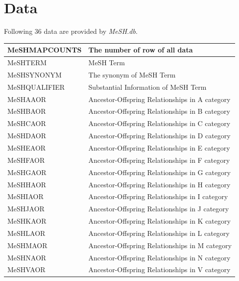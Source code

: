 \documentclass[11pt]{article}
\newcommand{\Rpackage}[1]{{\textit{#1}}}
\begin{document}
\section{Data}
Following 36 data are provided by \Rpackage{MeSH.db}.
\\
\begin{center}
  \begin{table}[htbp]
    \begin{tabular*}{150mm}{@{\extracolsep{\fill}}|p{40mm}|p{100mm}|}\hline
      MeSHMAPCOUNTS & The number of row of all data \\ \hline
      MeSHTERM & MeSH Term\\ \hline
      MeSHSYNONYM & The synonym of MeSH Term \\ \hline
      MeSHQUALIFIER & Substantial Information of MeSH Term \\ \hline \hline
      MeSHAAOR & Ancestor-Offspring Relationships in A category \\ \hline
      MeSHBAOR & Ancestor-Offspring Relationships in B category \\ \hline
      MeSHCAOR & Ancestor-Offspring Relationships in C category \\ \hline
      MeSHDAOR & Ancestor-Offspring Relationships in D category \\ \hline
      MeSHEAOR & Ancestor-Offspring Relationships in E category \\ \hline
      MeSHFAOR & Ancestor-Offspring Relationships in F category \\ \hline
      MeSHGAOR & Ancestor-Offspring Relationships in G category \\ \hline
      MeSHHAOR & Ancestor-Offspring Relationships in H category \\ \hline
      MeSHIAOR & Ancestor-Offspring Relationships in I category \\ \hline
      MeSHJAOR & Ancestor-Offspring Relationships in J category \\ \hline
      MeSHKAOR & Ancestor-Offspring Relationships in K category \\ \hline
      MeSHLAOR & Ancestor-Offspring Relationships in L category \\ \hline
      MeSHMAOR & Ancestor-Offspring Relationships in M category \\ \hline
      MeSHNAOR & Ancestor-Offspring Relationships in N category \\ \hline
      MeSHVAOR & Ancestor-Offspring Relationships in V category \\ \hline

\end{tabular*}
\end{table}
\end{center}
\end{document}
